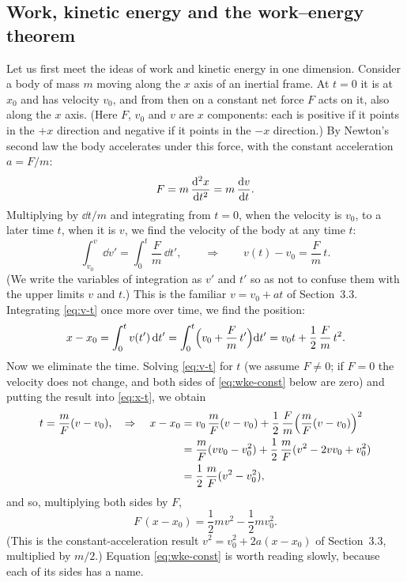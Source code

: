 \documentclass[11pt,a4paper]{article}
\begin{document}
\subsection{Work, kinetic energy and the work--energy theorem}\label{sec:wke}

Let us first meet the ideas of work and kinetic energy in one dimension. Consider a body of mass $m$
moving along the $x$ axis of an inertial frame. At $t = 0$ it is at $x_0$ and has velocity $v_0$, and
from then on a constant net force $F$ acts on it, also along the $x$ axis. (Here $F$, $v_0$ and $v$
are $x$ components: each is positive if it points in the $+x$ direction and negative if it points in
the $-x$ direction.) By Newton's second law the body accelerates under this force, with the constant
acceleration $a = F/m$:
\begin{equation}\label{eq:n2-1d}
  F = m\,\frac{\mathrm{d}^2 x}{\mathrm{d} t^2} = m\,\frac{\mathrm{d} v}{\mathrm{d} t} .
\end{equation}
Multiplying by $\dd t/m$ and integrating from $t = 0$, when the velocity is $v_0$, to a later time
$t$, when it is $v$, we find the velocity of the body at any time $t$:
\begin{equation}\label{eq:v-t}
  \int_{v_0}^{v} \dd v' = \int_0^{t} \frac{F}{m}\,\dd t' , \qquad\Rightarrow\qquad
  v(t) - v_0 = \frac{F}{m}\,t .
\end{equation}
(We write the variables of integration as $v'$ and $t'$ so as not to confuse them with the upper
limits $v$ and $t$.) This is the familiar $v = v_0 + at$ of Section~3.3. Integrating \eqref{eq:v-t}
once more over time, we find the position:
\begin{equation}\label{eq:x-t}
  x - x_0 = \int_0^t v(t')\,\mathrm{d} t' = \int_0^t \Bigl(v_0 + \frac{F}{m}\,t'\Bigr)\mathrm{d} t'
          = v_0 t + \frac12\,\frac{F}{m}\,t^2 .
\end{equation}
Now we eliminate the time. Solving \eqref{eq:v-t} for $t$ (we assume $F \neq 0$; if $F = 0$ the
velocity does not change, and both sides of \eqref{eq:wke-const} below are zero) and putting the
result into \eqref{eq:x-t}, we obtain
\begin{equation}\label{eq:eliminate-t}
\begin{split}
  t = \frac{m}{F}(v - v_0) , \quad\Rightarrow\quad x - x_0
    &= v_0\,\frac{m}{F}(v - v_0) + \frac12\,\frac{F}{m}\Bigl(\frac{m}{F}(v - v_0)\Bigr)^2 \\
    &= \frac{m}{F}(vv_0 - v_0^2) + \frac12\,\frac{m}{F}(v^2 - 2vv_0 + v_0^2) \\
    &= \frac12\,\frac{m}{F}(v^2 - v_0^2) ,
\end{split}
\end{equation}
and so, multiplying both sides by $F$,
\begin{equation}\label{eq:wke-const}
  F\,(x - x_0) = \frac12 mv^2 - \frac12 mv_0^2 .
\end{equation}
(This is the constant-acceleration result $v^2 = v_0^2 + 2a(x - x_0)$ of Section~3.3, multiplied by
$m/2$.) Equation \eqref{eq:wke-const} is worth reading slowly, because each of its sides has a name.
\end{document}
